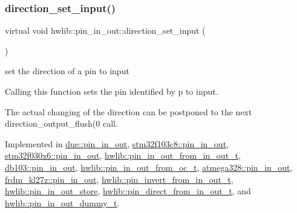 \subsubsection{\texorpdfstring{direction\+\_\+set\+\_\+input()}{direction\_set\_input()}}
{\footnotesize\ttfamily virtual void hwlib\+::pin\+\_\+in\+\_\+out\+::direction\+\_\+set\+\_\+input (\begin{DoxyParamCaption}{ }\end{DoxyParamCaption})\hspace{0.3cm}{\ttfamily [pure virtual]}}

set the direction of a pin to input

Calling this function sets the pin identified by p to input.

The actual changing of the direction can be postponed to the next direction\+\_\+output\+\_\+flush(0 call. 

Implemented in \hyperlink{classdue_1_1pin__in__out_a2ca0c81a7e1059a171c997d5015d99ea}{due\+::pin\+\_\+in\+\_\+out}, \hyperlink{classstm32f103c8_1_1pin__in__out_ac76dc0765d36d13b9d24f7939af1e39f}{stm32f103c8\+::pin\+\_\+in\+\_\+out}, \hyperlink{classstm32f030x6_1_1pin__in__out_acdd7df5a6a647c2e4f63587880a855ca}{stm32f030x6\+::pin\+\_\+in\+\_\+out}, \hyperlink{classhwlib_1_1pin__in__out__from__in__out__t_a0b0a260c43a6f1162fd5bc6bbffeaa15}{hwlib\+::pin\+\_\+in\+\_\+out\+\_\+from\+\_\+in\+\_\+out\+\_\+t}, \hyperlink{classdb103_1_1pin__in__out_af03a8c83335daf7c529a6a73fdfbf1b4}{db103\+::pin\+\_\+in\+\_\+out}, \hyperlink{classhwlib_1_1pin__in__out__from__oc__t_afb5147f7a8a702c839d0d55b7b3f245d}{hwlib\+::pin\+\_\+in\+\_\+out\+\_\+from\+\_\+oc\+\_\+t}, \hyperlink{classatmega328_1_1pin__in__out_a34896fc52b64f2a3c6d731e3cf0d75ca}{atmega328\+::pin\+\_\+in\+\_\+out}, \hyperlink{classfrdm__kl27z_1_1pin__in__out_ad79b75a4e50849d72506746cbea81160}{frdm\+\_\+kl27z\+::pin\+\_\+in\+\_\+out}, \hyperlink{classhwlib_1_1pin__invert__from__in__out__t_a2d332560ffbdac49b5807f43bb908b46}{hwlib\+::pin\+\_\+invert\+\_\+from\+\_\+in\+\_\+out\+\_\+t}, \hyperlink{classhwlib_1_1pin__in__out__store_a0e37e1e5712f3f929828687af68e0f1a}{hwlib\+::pin\+\_\+in\+\_\+out\+\_\+store}, \hyperlink{classhwlib_1_1pin__direct__from__in__out__t_a7326f2559461b3efd0fbf1af4fd7fdff}{hwlib\+::pin\+\_\+direct\+\_\+from\+\_\+in\+\_\+out\+\_\+t}, and \hyperlink{classhwlib_1_1pin__in__out__dummy__t_af5f3e57b6496dc0e523fe6000e2caefc}{hwlib\+::pin\+\_\+in\+\_\+out\+\_\+dummy\+\_\+t}.

\mbox{\label{classhwlib_1_1pin__in__out_ad08a5f5e9a4c3aadaa7c665b98f2418e}} 
